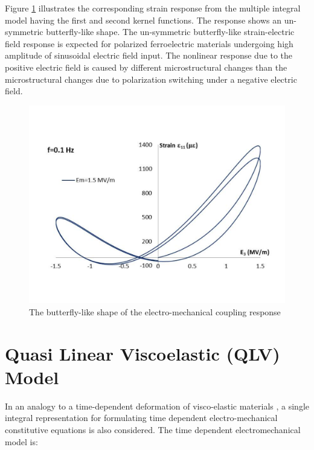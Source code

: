 Figure \ref{fig_3_9_the_butterfly_like_shape_of_the_electro_mechanical_coupling_response} illustrates the corresponding strain response from the multiple integral model
having the first and second kernel functions. The response shows an un-symmetric
butterfly-like shape. The un-symmetric butterfly-like strain-electric field response is
expected for polarized ferroelectric materials undergoing high amplitude of sinusoidal
electric field input. The nonlinear response due to the positive electric field is caused by
different microstructural changes than the microstructural changes due to polarization
switching under a negative electric field. 

\begin{figure}
\centering
\includegraphics[width=5.0in]
{./chap_3_minor_loop/figures/fig_3_9_the_butterfly-like_shape_of_the_electro-mechanical_coupling_response.pdf}
\caption{The butterfly-like shape of the electro-mechanical coupling response}
\label{fig_3_9_the_butterfly_like_shape_of_the_electro_mechanical_coupling_response}
\end{figure}

\section{Quasi Linear Viscoelastic (QLV) Model \cite{sohrabi2015nonlinear}} 
In an analogy to a time-dependent deformation of visco-elastic materials \cite{Wineman2000}, 
a single integral representation for formulating time dependent electro-mechanical constitutive equations is also considered.
The time dependent electromechanical model is:  

